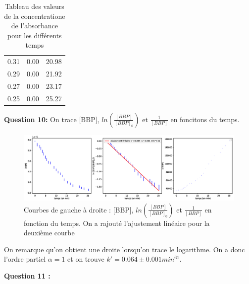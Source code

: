 \documentclass[12pt]{article}
\begin{document}
\begin{table}[h!]
\begin{center}
\begin{tabular}{|c|c|c|}
                          0.31 &                   0.00 &                  20.98 \\
                          0.29 &                   0.00 &                  21.92 \\
                          0.27 &                   0.00 &                  23.17 \\
                          0.25 &                   0.00 &                  25.27 \\
        \hline
        \end{tabular}
        \caption{Tableau des valeurs de la concentratione de l'absorbance pour les différents temps}
        \label{table1}
\end{center}
\end{table}
\textbf{Question 10:}
On trace [BBP], $ln \left(\frac{[BBP]}{[BBP]_0}\right)$ et $\frac{1}{[BBP]}$ en foncitons du temps.

\begin{figure}[h!]
    \begin{center}
        \includegraphics[scale=0.5]{3CourbesCinétiques.eps}
        \caption{Courbes de gauche à droite : [BBP], $ln \left(\frac{[BBP]}{[BBP]_0}\right)$ et $\frac{1}{[BBP]}$ en fonction du temps. On a rajouté l'ajustement linéaire pour la deuxième courbe}
        \label{img:3courbes}
    \end{center}
\end{figure}

On remarque qu'on obtient une droite lorsqu'on trace le logarithme.
On a donc l'ordre partiel $\alpha =1$ et on trouve $k'=0.064 \pm 0.001 min^{61}$.

\textbf{Question 11 :}
\end{document}
